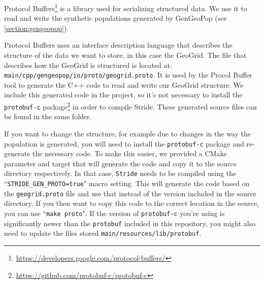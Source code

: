 Protocol Buffers\footnote{\url{https://developers.google.com/protocol-buffers/}} is a library used for serializing structured data. We use it to read and write the synthetic populations generated by GenGeoPop (see \ref{section:gengeopop}).

Protocol Buffers uses an interface description language that describes the structure of the data we want to store, in this case the GeoGrid. The file that describes how the GeoGrid is structured is located at:
\texttt{main/cpp/gengeopop/io/proto/geogrid.proto}. It is used by the Procol Buffer tool to generate the C++ code to read and write our GeoGrid structure. We include this generated code in the project, so it's not necessary to install the \texttt{protobuf-c} package\footnote{\url{https://github.com/protobuf-c/protobuf-c}} in order to compile Stride. These generated source files can be found in the same folder.

If you want to change the structure, for example due to changes in the way the population is generated, you will need to install the \texttt{protobuf-c}  package and re-generate the necessary code. To make this easier, we provided a CMake parameter and target that will generate the code and copy it to the source directory respectively. In that case, \texttt{Stride} needs to be compiled using the ``\texttt{STRIDE\_GEN\_PROTO=true}" macro setting. This will generate the code based on the \texttt{geogrid.proto} file and use that instead of the version included in the source directory. If you then want to copy this code to the correct location in the source, you can use ``\texttt{make proto}". If the version of \texttt{protobuf-c} you're using is significantly newer than the \texttt{protobuf} included in this repository, you might also need to update the files stored \texttt{main/resources/lib/protobuf}.

